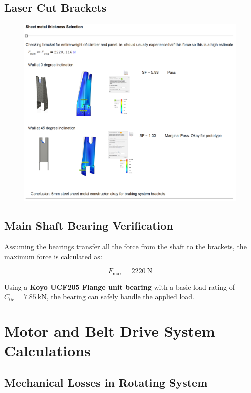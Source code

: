 \subsection*{Laser Cut Brackets}

\begin{figure}[H]
    \centering
    \includegraphics[width=1\linewidth]{chaps-append/calcs/FEM_brackets.png}
\end{figure}

\subsection*{Main Shaft Bearing Verification}

Assuming the bearings transfer all the force from the shaft to the brackets, the maximum force is calculated as:

\[
F_{\text{max}} = 2220\ \text{N}
\]

Using a \textbf{Koyo UCF205 Flange unit bearing} with a basic load rating of \( C_{0r} = 7.85\ \text{kN} \), the bearing can safely handle the applied load.

\section{Motor and Belt Drive System Calculations}
\label{calcs:motor_belt}

\subsection*{Mechanical Losses in Rotating System}

